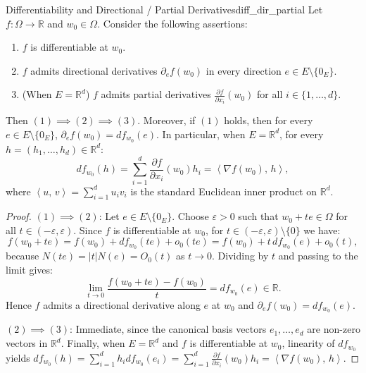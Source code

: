 \documentclass[11pt, a4paper]{article}
\newcommand{\R}{\mathbb{R}}
\newcommand{\eps}{\varepsilon}
\newcommand{\inner}[2]{\left\langle#1,\,#2\right\rangle}
\begin{document}
\begin{proposition}{Differentiability and Directional / Partial Derivatives}{diff_dir_partial}
Let $f: \Omega \to \R$ and $w_0 \in \Omega$. Consider the following assertions:
\begin{enumerate}
    \item $f$ is differentiable at $w_0$.
    \item $f$ admits directional derivatives $\partial_e f(w_0)$ in every direction $e \in E \setminus \{0_E\}$.
    \item (When $E = \R^d$) $f$ admits partial derivatives $\frac{\partial f}{\partial x_i}(w_0)$ for all $i \in \{1, \dots, d\}$.
\end{enumerate}
Then $(1) \implies (2) \implies (3)$. Moreover, if $(1)$ holds, then for every $e \in E \setminus \{0_E\}$, $\partial_e f(w_0) = df_{w_0}(e)$. In particular, when $E = \R^d$, for every $h = (h_1, \dots, h_d) \in \R^d$:
\[
df_{w_0}(h) = \sum_{i=1}^d \frac{\partial f}{\partial x_i}(w_0) h_i = \inner{\nabla f(w_0)}{h},
\]
where $\inner{u}{v} = \sum_{i=1}^d u_i v_i$ is the standard Euclidean inner product on $\R^d$.
\end{proposition}
\begin{proof}
$(1) \implies (2)$: Let $e \in E \setminus \{0_E\}$. Choose $\eps > 0$ such that $w_0 + t e \in \Omega$ for all $t \in (-\eps, \eps)$. Since $f$ is differentiable at $w_0$, for $t \in (-\eps, \eps) \setminus \{0\}$ we have:
\[
f(w_0 + t e) = f(w_0) + df_{w_0}(t e) + o_0(t e) = f(w_0) + t \, df_{w_0}(e) + o_0(t),
\]
because $N(t e) = |t| N(e) = O_0(t)$ as $t \to 0$. Dividing by $t$ and passing to the limit gives:
\[
\lim_{t \to 0} \frac{f(w_0 + t e) - f(w_0)}{t} = df_{w_0}(e) \in \R.
\]
Hence $f$ admits a directional derivative along $e$ at $w_0$ and $\partial_e f(w_0) = df_{w_0}(e)$.

$(2) \implies (3)$: Immediate, since the canonical basis vectors $e_1, \dots, e_d$ are non-zero vectors in $\R^d$. Finally, when $E = \R^d$ and $f$ is differentiable at $w_0$, linearity of $df_{w_0}$ yields $df_{w_0}(h) = \sum_{i=1}^d h_i df_{w_0}(e_i) = \sum_{i=1}^d \frac{\partial f}{\partial x_i}(w_0) h_i = \inner{\nabla f(w_0)}{h}$.
\end{proof}
\end{document}
